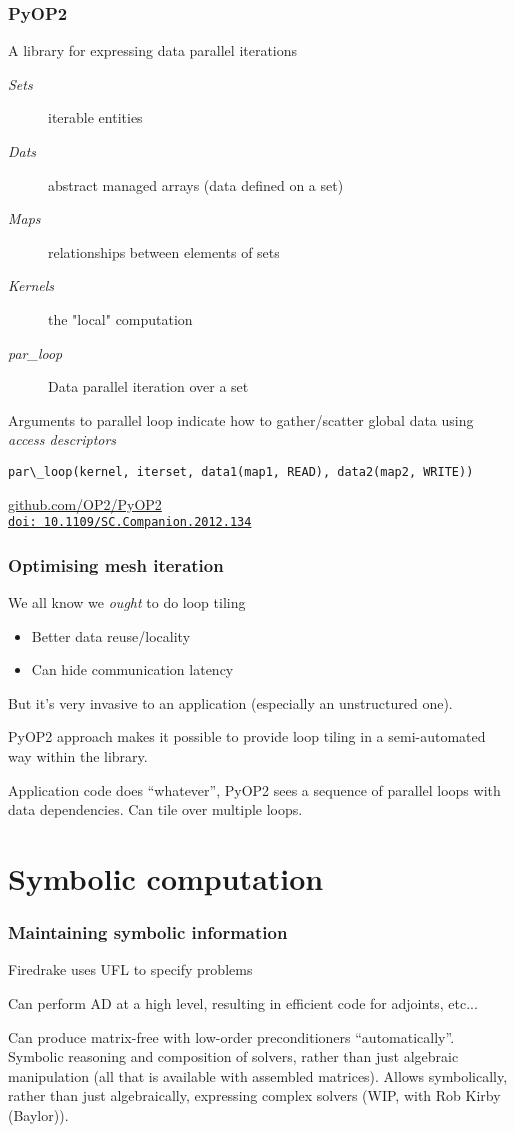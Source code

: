 \documentclass[presentation]{beamer}
\newcommand{\doilink}[1]{%
  \href{http://dx.doi.org/#1}%
  {{\small\texttt{doi:\,#1}{}}}%
}
\begin{document}
\begin{frame}[fragile]
  \frametitle{PyOP2}
  A library for expressing data parallel iterations
\begin{description}
\item[{\emph{Sets}}] iterable entities
\item[{\emph{Dats}}] abstract managed arrays (data defined on a set)
\item[{\emph{Maps}}] relationships between elements of sets
\item[{\emph{Kernels}}] the "local" computation
\item[{\emph{par\_loop}}] Data parallel iteration over a set
\end{description}
Arguments to parallel loop indicate how to gather/scatter global
data using \emph{access descriptors}

\begin{verbatim}
par\_loop(kernel, iterset, data1(map1, READ), data2(map2, WRITE))
\end{verbatim}
\begin{center}
  \url{github.com/OP2/PyOP2}\\
  \cite{Rathgeber:2012} \doilink{10.1109/SC.Companion.2012.134}
\end{center}
\end{frame}

\begin{frame}
  \frametitle{Optimising mesh iteration}
  We all know we \emph{ought} to do loop tiling
  \begin{itemize}
  \item Better data reuse/locality
  \item Can hide communication latency
  \end{itemize}
  But it's very invasive to an application (especially an unstructured
  one).

  PyOP2 approach makes it possible to provide loop tiling in a
  semi-automated way within the library.

  Application code does ``whatever'', PyOP2 sees a sequence of
  parallel loops with data dependencies.  Can tile over multiple
  loops.
\end{frame}


\section{Symbolic computation}

\begin{frame}
  \frametitle{Maintaining symbolic information}
  Firedrake uses UFL \cite{Alnaes:2014} to specify problems

  Can perform AD at a high level, resulting in efficient code for
  adjoints, etc...

  Can produce matrix-free with low-order preconditioners
  ``automatically''.  Symbolic reasoning and composition of solvers,
  rather than just algebraic manipulation (all that is available with
  assembled matrices).
  Allows symbolically, rather than just algebraically, expressing
  complex solvers (WIP, with Rob Kirby (Baylor)).
\end{frame}
\end{document}
